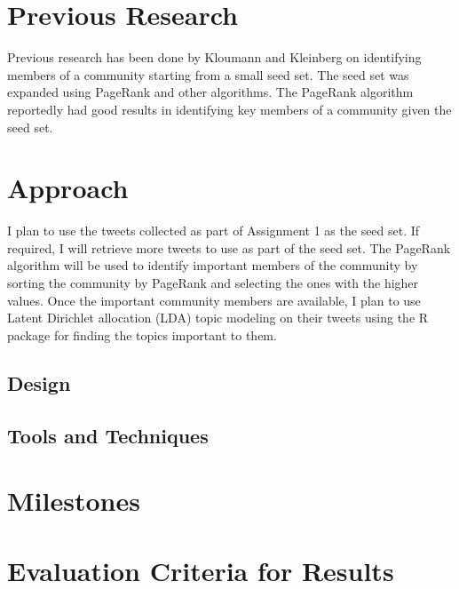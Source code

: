 \documentclass{sig-alternate-05-2015}
\begin{document}
\section{Previous Research}

Previous research has been done by Kloumann and Kleinberg \cite{SeedSet} on identifying members of a community starting from a small seed set. The seed set was expanded using PageRank and other algorithms. The PageRank algorithm reportedly had good results in identifying key members of a community given the seed set.
\section{Approach}
I plan to use the tweets collected as part of Assignment 1 as the seed set. If required, I will retrieve more tweets to use as part of the seed set. The PageRank algorithm will be used to identify important members of the community by sorting the community by PageRank and selecting the ones with the higher values. Once the important community members are available, I plan to use Latent Dirichlet allocation (LDA) topic modeling on their tweets using the R package for finding the topics important to them.

\subsection{Design}
\subsection{Tools and Techniques}
\section{Milestones}
\section{Evaluation Criteria for Results}
\end{document}
